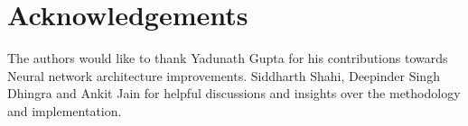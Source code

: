 \section{Acknowledgements}
The authors would like to thank Yadunath Gupta for his contributions towards Neural network architecture improvements. 
Siddharth Shahi, Deepinder Singh Dhingra and Ankit Jain for helpful discussions and insights over the methodology
and implementation.